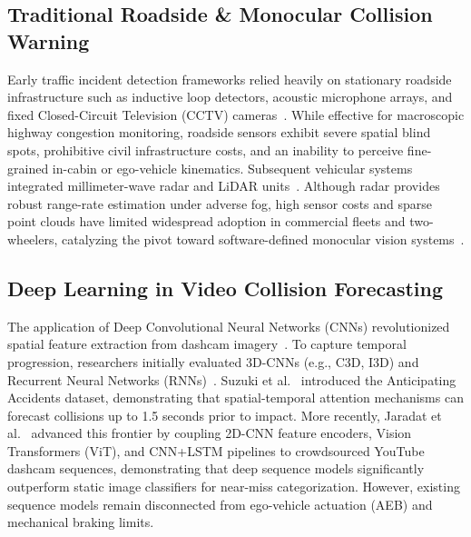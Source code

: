 \documentclass[journal,compsoc]{IEEEtran}
\begin{document}
\subsection{Traditional Roadside \& Monocular Collision Warning}
Early traffic incident detection frameworks relied heavily on stationary roadside infrastructure such as inductive loop detectors, acoustic microphone arrays, and fixed Closed-Circuit Television (CCTV) cameras~\cite{buch2011review, dewan2021multimodal}. While effective for macroscopic highway congestion monitoring, roadside sensors exhibit severe spatial blind spots, prohibitive civil infrastructure costs, and an inability to perceive fine-grained in-cabin or ego-vehicle kinematics. Subsequent vehicular systems integrated millimeter-wave radar and LiDAR units~\cite{dewan2021multimodal, li2022deep}. Although radar provides robust range-rate estimation under adverse fog, high sensor costs and sparse point clouds have limited widespread adoption in commercial fleets and two-wheelers, catalyzing the pivot toward software-defined monocular vision systems~\cite{ren2017faster}.

\subsection{Deep Learning in Video Collision Forecasting}
The application of Deep Convolutional Neural Networks (CNNs) revolutionized spatial feature extraction from dashcam imagery~\cite{carreira2017quo}. To capture temporal progression, researchers initially evaluated 3D-CNNs (e.g., C3D, I3D) and Recurrent Neural Networks (RNNs)~\cite{carreira2017quo}. Suzuki et al.~\cite{suzuki2018anticipating} introduced the Anticipating Accidents dataset, demonstrating that spatial-temporal attention mechanisms can forecast collisions up to 1.5 seconds prior to impact. More recently, Jaradat et al.~\cite{jaradat2025leveraging} advanced this frontier by coupling 2D-CNN feature encoders, Vision Transformers (ViT), and CNN+LSTM pipelines to crowdsourced YouTube dashcam sequences, demonstrating that deep sequence models significantly outperform static image classifiers for near-miss categorization. However, existing sequence models remain disconnected from ego-vehicle actuation (AEB) and mechanical braking limits.
\end{document}
